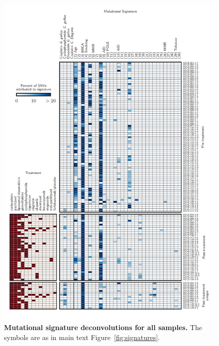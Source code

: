 \begin{figure}
\centering
\includegraphics[scale=1.0]{figures/supplementary_signatures.pdf}
\caption{\textbf{Mutational signature deconvolutions for all samples.} The symbols are as in main text Figure~\ref{fig:signatures}.}
\label{fig:supp_signatures}
\end{figure}

